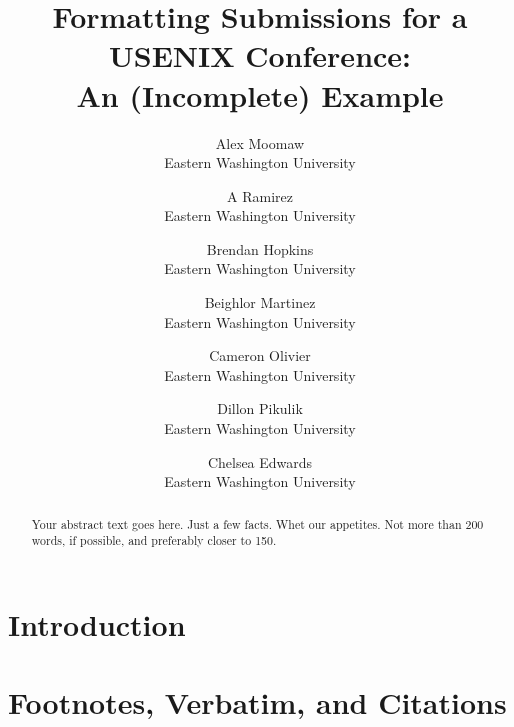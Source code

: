 \documentclass[letterpaper,twocolumn,10pt]{article}
\begin{document}

\date{}

\title{\Large \bf Formatting Submissions for a USENIX Conference:\\
  An (Incomplete) Example}

\author{
{\rm Alex Moomaw}\\
Eastern Washington University
\and
{\rm A Ramirez}\\
Eastern Washington University
\and
{\rm Brendan Hopkins}\\
Eastern Washington University
\and
{\rm Beighlor Martinez}\\
Eastern Washington University
\and
{\rm Cameron Olivier}\\
Eastern Washington University
\and
{\rm Dillon Pikulik}\\
Eastern Washington University
\and
{\rm Chelsea Edwards}\\
Eastern Washington University

} %

\maketitle

\begin{abstract}
Your abstract text goes here. Just a few facts. Whet our appetites.
Not more than 200 words, if possible, and preferably closer to 150.
\end{abstract}


\section{Introduction}


\section{Footnotes, Verbatim, and Citations}

\end{document}
